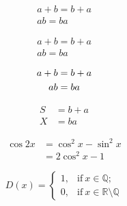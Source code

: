 \documentclass{ctexart}
\begin{document}
    \begin{gather}
        a + b = b + a \\ %
        ab = ba
    \end{gather}

    \begin{gather*} %
        a + b = b + a \\ 
        ab = ba
    \end{gather*}

    \begin{gather}
        a + b = b + a  \notag\\  %
        ab = ba 
    \end{gather}

    \begin{align} %
        S &= b + a \\ %
        X &= ba
    \end{align}


    \begin{equation}
        \begin{split}
            \cos 2x &= \cos^2 x - \sin^2 x \\
            &= 2\cos^2 x - 1
        \end{split}
    \end{equation}

    \begin{equation}
        D(x) = \begin{cases}
            1, & \text{if} \ x \in \mathbb{Q}; \\
            0, & \text{if} \ x \in \mathbb{R} \setminus \mathbb{Q}
        \end{cases}
    \end{equation}
\end{document}
